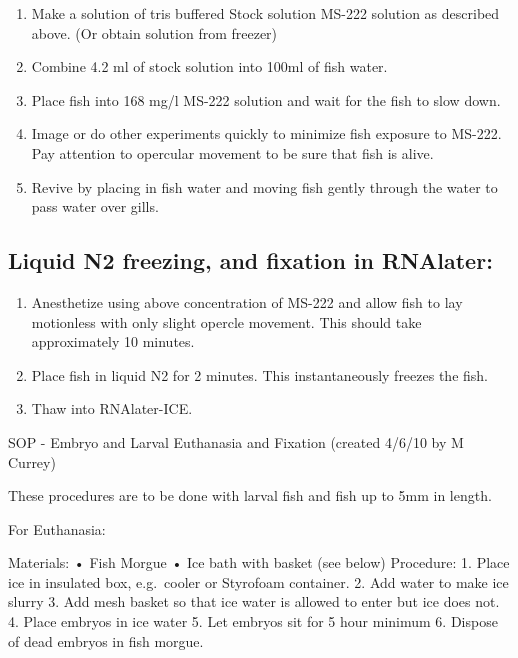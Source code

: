 \documentclass[
]{book}
\providecommand{\tightlist}{%
  \setlength{\itemsep}{0pt}\setlength{\parskip}{0pt}}
\begin{document}
\begin{enumerate}
\def\labelenumi{\arabic{enumi}.}
\tightlist
\item
  Make a solution of tris buffered Stock solution MS-222 solution as described above. (Or obtain solution from freezer)
\item
  Combine 4.2 ml of stock solution into 100ml of fish water.
\item
  Place fish into 168 mg/l MS-222 solution and wait for the fish to slow down.
\item
  Image or do other experiments quickly to minimize fish exposure to MS-222. Pay attention to opercular movement to be sure that fish is alive.
\item
  Revive by placing in fish water and moving fish gently through the water to pass water over gills.
\end{enumerate}

\hypertarget{liquid-n2-freezing-and-fixation-in-rnalater}{%
\subsection{Liquid N2 freezing, and fixation in RNAlater:}\label{liquid-n2-freezing-and-fixation-in-rnalater}}

\begin{enumerate}
\def\labelenumi{\arabic{enumi}.}
\tightlist
\item
  Anesthetize using above concentration of MS-222 and allow fish to lay motionless with only slight opercle movement. This should take approximately 10 minutes.
\item
  Place fish in liquid N2 for 2 minutes. This instantaneously freezes the fish.
\item
  Thaw into RNAlater-ICE.
\end{enumerate}

SOP - Embryo and Larval Euthanasia and Fixation
(created 4/6/10 by M Currey)

These procedures are to be done with larval fish and fish up to 5mm in length.

For Euthanasia:

Materials:
• Fish Morgue
• Ice bath with basket (see below)
Procedure:
1. Place ice in insulated box, e.g.~cooler or Styrofoam container.
2. Add water to make ice slurry
3. Add mesh basket so that ice water is allowed to enter but ice does not.
4. Place embryos in ice water
5. Let embryos sit for 5 hour minimum
6. Dispose of dead embryos in fish morgue.
\end{document}

